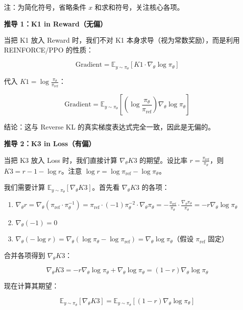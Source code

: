注：为简化符号，省略条件 \(x\) 和求和符号，关注核心各项。

\textbf{推导 1：K1 in Reward（无偏）}

当把 K1 放入 Reward 时，我们不对 K1 本身求导（视为常数奖励），而是利用 REINFORCE/PPO 的性质：

\[
\mathrm{Gradient}
=\mathbb{E}_{y\sim\pi_\theta}\left[K1\cdot\nabla_\theta\log\pi_\theta\right]
\]

代入 \(K1=\log\frac{\pi_\theta}{\pi_{\mathrm{ref}}}\)：

\[
\mathrm{Gradient}
=\mathbb{E}_{y\sim\pi_\theta}\left[
\left(\log\frac{\pi_\theta}{\pi_{\mathrm{ref}}}\right)
\nabla_\theta\log\pi_\theta
\right]
\]

结论：这与 Reverse KL 的真实梯度表达式完全一致，因此是无偏的。

\textbf{推导 2：K3 in Loss（有偏）}

当把 K3 放入 Loss 时，我们直接计算 \(\nabla_\theta K3\) 的期望。设比率 \(r=\frac{\pi_{\mathrm{ref}}}{\pi_\theta}\)，则 \(K3=r-1-\log r\)。注意 \(\log r=\log\pi_{\mathrm{ref}}-\log\pi_\theta\)。

我们需要计算 \(\mathbb{E}_{y\sim\pi_\theta}[\nabla_\theta K3]\)。首先看 \(\nabla_\theta K3\) 的各项：

\begin{enumerate}
\def\labelenumi{\arabic{enumi}.}
\tightlist
\item
  \(\nabla_\theta r=\nabla_\theta(\pi_{\mathrm{ref}}\cdot\pi_\theta^{-1})=\pi_{\mathrm{ref}}\cdot(-1)\pi_\theta^{-2}\cdot\nabla_\theta\pi_\theta=-\frac{\pi_{\mathrm{ref}}}{\pi_\theta}\cdot\frac{\nabla_\theta\pi_\theta}{\pi_\theta}=-r\nabla_\theta\log\pi_\theta\)
\item
  \(\nabla_\theta(-1)=0\)
\item
  \(\nabla_\theta(-\log r)=\nabla_\theta(\log\pi_\theta-\log\pi_{\mathrm{ref}})=\nabla_\theta\log\pi_\theta\)（假设 \(\pi_{\mathrm{ref}}\) 固定）
\end{enumerate}

合并各项得到 \(\nabla_\theta K3\)：

\[
\nabla_\theta K3
=-r\nabla_\theta\log\pi_\theta+\nabla_\theta\log\pi_\theta
=(1-r)\nabla_\theta\log\pi_\theta
\]

现在计算其期望：

\[
\mathbb{E}_{y\sim\pi_\theta}[\nabla_\theta K3]
=\mathbb{E}_{y\sim\pi_\theta}\left[(1-r)\nabla_\theta\log\pi_\theta\right]
\]

